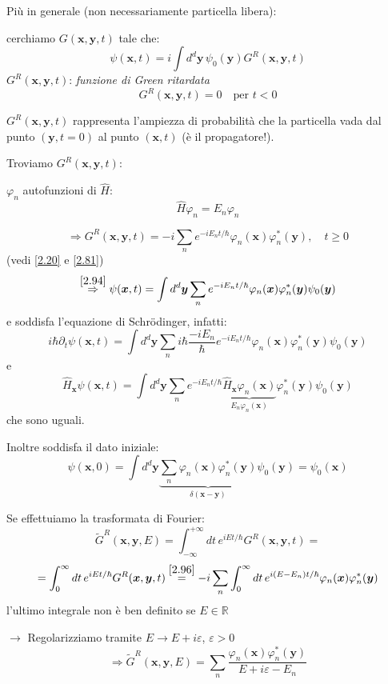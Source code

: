 \documentclass[a4paper,11pt]{report}
\newcommand{\R}{\mathbb{R}}
\newcommand{\x}{\boldsymbol{x}}
\newcommand{\y}{\boldsymbol{y}}
\begin{document}
Pi\`u in generale (non necessariamente particella libera):

cerchiamo $G(\x,\y,t)$ tale che:
\begin{equation}
\psi(\x,t)=i\int d^d\y\, \psi_0(\y) G^R(\x,\y,t)
\label{2.94}
\end{equation}
$G^R(\x,\y,t)$: \emph{funzione di Green ritardata}
\[
G^R(\x,\y,t)=0 \quad \text{per }t<0
\] 

$G^R(\x,\y,t)$ rappresenta l'ampiezza di probabilit\`a che la particella vada dal punto $(\y,t=0)$ al punto $(\x,t)$ (\`e il propagatore!).

\smallskip

Troviamo $G^R(\x,\y,t)$:

$\varphi_n$ autofunzioni di $\hat{H}$:
\begin{equation}
\hat{H}\varphi_n=E_n \varphi_n 
\label{2.95}
\end{equation}

\begin{equation}
\Rightarrow G^R(\x,\y,t)=-i\sum_n e^{-iE_nt/\hbar}\varphi_n(\x)\varphi_n^* (\y), \quad t\geq 0
\label{2.96}
\end{equation}
(vedi \eqref{2.20} e \eqref{2.81})
\[
\overset{\eqref{2.94}}{\Rightarrow} \psi(\x,t)=\int d^d\y \sum_n e^{-iE_nt/\hbar}\varphi_n(\x)\varphi_n^* (\y)\psi_0(\y)
\]
e soddisfa l'equazione di Schr\"odinger, infatti:
\[
i\hbar\partial_t\psi(\x,t)=\int d^d\y \sum_n i\hbar \frac{-iE_n}{\hbar} e^{-iE_nt/\hbar}\varphi_n(\x)\varphi_n^* (\y)\psi_0(\y)
\]
e
\[
\hat{H}_{\x}\psi(\x,t)=\int d^d\y \sum_n e^{-iE_nt/\hbar}\underbrace{\hat{H}_{\x}\varphi_n(\x)}_{E_n\varphi_n(\x)} \varphi_n^* (\y)\psi_0(\y)
\]
che sono uguali.

Inoltre soddisfa il dato iniziale:
\[
\psi(\x,0)=\int d^d\y \underbrace{\sum_n \varphi_n(\x)\varphi_n^* (\y)}_{\delta(\x-\y)} \psi_0(\y)=\psi_0(\x)
\]

Se effettuiamo la trasformata di Fourier:
\[
\tilde{G}^R(\x,\y,E)=\int_{-\infty}^{+\infty}dt\, e^{iEt/\hbar}G^R(\x,\y,t)= 
\]
\[
=\int_0^\infty dt\, e^{iEt/\hbar}G^R(\x,\y,t)\overset{\eqref{2.96}}{=}-i\sum_n\int_0^\infty dt\, e^{i(E-E_n)t/\hbar}\varphi_n(\x)\varphi_n^*(\y)
\]
l'ultimo integrale non \`e ben definito se $E\in \R$ 

$\rightarrow$ Regolarizziamo tramite $E\to E+i\varepsilon$, $\varepsilon >0$
\begin{equation}
\Rightarrow \tilde{G}^R(\x,\y,E)=\sum_n\frac{\varphi_n(\x)\varphi_n^*(\y)}{E+i\varepsilon - E_n}
\label{2.97}
\end{equation}
\end{document}

